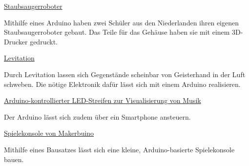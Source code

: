 \vfill
\begin{links}
	\item \href{https://www.heise.de/make/meldung/Schueler-Projekt-Selbstbau-Staubsaugerroboter-aus-dem-3D-Drucker-3991208.html}{Staubsaugerroboter}
	
	Mithilfe eines Arduino haben zwei Schüler aus den Niederlanden ihren eigenen Staubsaugerroboter gebaut. Das Teile für das Gehäuse haben sie mit einem 3D-Drucker gedruckt.
	
	\item \href{https://www.heise.de/make/artikel/Einfacher-Ultraschall-Levitationsapparat-4022505.html}{Levitation}
	
	Durch Levitation lassen sich Gegenstände scheinbar von Geisterhand in der Luft schweben. Die nötige Elektronik dafür lässt sich mit einem Arduino realisieren.
	
	\item \href{https://www.instructables.com/id/Party-Lights-1/}{Arduino-kontrollierter LED-Streifen zur Visualisierung von Musik}
	
	Der Arduino lässt sich zudem über ein Smartphone ansteuern.
	
	\item \href{https://www.heise.de/make/meldung/Makerbuino-Spielkonsole-fuer-den-Eigenbau-3681578.html}{Spielekonsole von Makerbuino}
	
	Mithilfe eines Bausatzes lässt sich eine kleine, Arduino-basierte Spielekonsole bauen.
\end{links}

